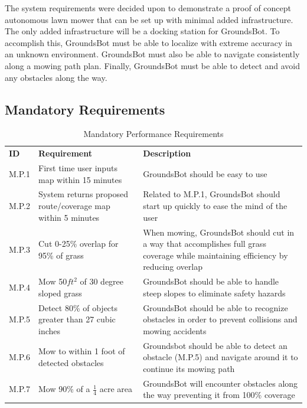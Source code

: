 \documentclass[12pt]{extarticle}
\begin{document}
The system requirements were decided upon to demonstrate a proof of concept autonomous lawn mower that can be set up with minimal added infrastructure. The only added infrastructure will be a docking station for GroundsBot. To accomplish this, GroundsBot must be able to localize with extreme accuracy in an unknown environment. GroundsBot must also be able to navigate consistently along a mowing path plan. Finally, GroundsBot must be able to detect and avoid any obstacles along the way.

\subsection{Mandatory Requirements}
\begin{center}
  \begin{table}[H]
  \caption{Mandatory Performance Requirements}
  \label{table:mandatory performance}
  
  \vspace{1em}

  \def\arraystretch{1.5}
  	\begin{tabularx}{\textwidth}{ lXX }
  	  	\hline
		\textbf{ID} & \textbf{Requirement} & \textbf{Description} \\
    	M.P.1 &
    	First time user inputs map within 15 minutes &
    	GroundsBot should be easy to use \\
   		M.P.2 &
   		System returns proposed route/coverage map within 5 minutes &
   		Related to M.P.1, GroundsBot should start up quickly to ease the mind of the user \\
   		M.P.3 &
   		Cut 0-25\% overlap for 95\% of grass &
   		When mowing, GroundsBot should cut in a way that accomplishes full grass coverage while maintaining efficiency by reducing overlap\\
		M.P.4 &
		Mow 50$ft^2$ of 30 degree sloped grass &
		GroundsBot should be able to handle steep slopes to eliminate safety hazards \\
		M.P.5 &
		Detect 80\% of objects greater than 27 cubic inches &
		GroundsBot should be able to recognize obstacles in order to prevent collisions and mowing accidents \\
		M.P.6 &
		Mow to within 1 foot of detected obstacles &
		Groundsbot should be able to detect an obstacle (M.P.5) and navigate around it to continue its mowing path \\
		M.P.7 &
		Mow 90\% of a $\frac{1}{4}$ acre area &
		GroundsBot will encounter obstacles along the way preventing it from 100\% coverage \\
	\end{tabularx}
  \end{table}
\end{center}
\end{document}
